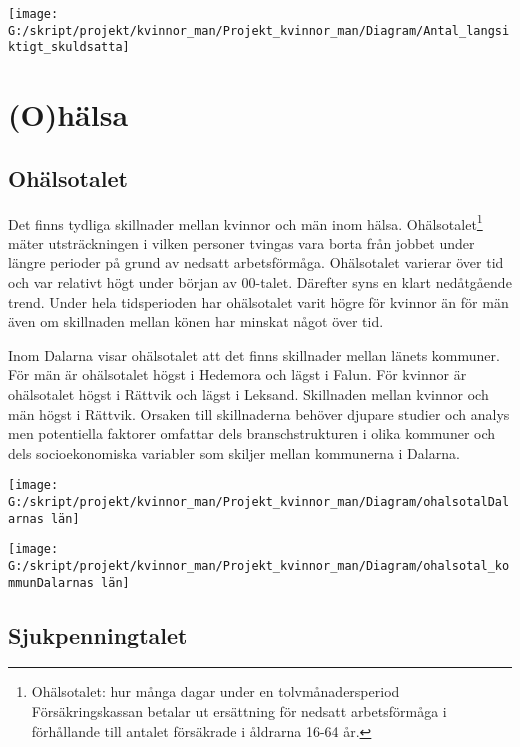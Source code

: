 \documentclass[
]{article}
\begin{document}
\begin{center}\texttt{[image: G:/skript/projekt/kvinnor\_man/Projekt\_kvinnor\_man/Diagram/Antal\_langsiktigt\_skuldsatta]} \end{center}

\hypertarget{ohuxe4lsa}{%
\section{(O)hälsa}\label{ohuxe4lsa}}

\hypertarget{ohuxe4lsotalet}{%
\subsection{Ohälsotalet}\label{ohuxe4lsotalet}}

Det finns tydliga skillnader mellan kvinnor och män inom hälsa.
Ohälsotalet\footnote{Ohälsotalet: hur många dagar under en
  tolvmånadersperiod Försäkringskassan betalar ut ersättning för nedsatt
  arbetsförmåga i förhållande till antalet försäkrade i åldrarna 16-64
  år.} mäter utsträckningen i vilken personer tvingas vara borta från
jobbet under längre perioder på grund av nedsatt arbetsförmåga.
Ohälsotalet varierar över tid och var relativt högt under början av
00-talet. Därefter syns en klart nedåtgående trend. Under hela
tidsperioden har ohälsotalet varit högre för kvinnor än för män även om
skillnaden mellan könen har minskat något över tid.

Inom Dalarna visar ohälsotalet att det finns skillnader mellan länets
kommuner. För män är ohälsotalet högst i Hedemora och lägst i Falun. För
kvinnor är ohälsotalet högst i Rättvik och lägst i Leksand. Skillnaden
mellan kvinnor och män högst i Rättvik. Orsaken till skillnaderna
behöver djupare studier och analys men potentiella faktorer omfattar
dels branschstrukturen i olika kommuner och dels socioekonomiska
variabler som skiljer mellan kommunerna i Dalarna.

\begin{center}\texttt{[image: G:/skript/projekt/kvinnor\_man/Projekt\_kvinnor\_man/Diagram/ohalsotalDalarnas län]} \end{center}

\begin{center}\texttt{[image: G:/skript/projekt/kvinnor\_man/Projekt\_kvinnor\_man/Diagram/ohalsotal\_kommunDalarnas län]} \end{center}

\hypertarget{sjukpenningtalet}{%
\subsection{Sjukpenningtalet}\label{sjukpenningtalet}}
\end{document}
